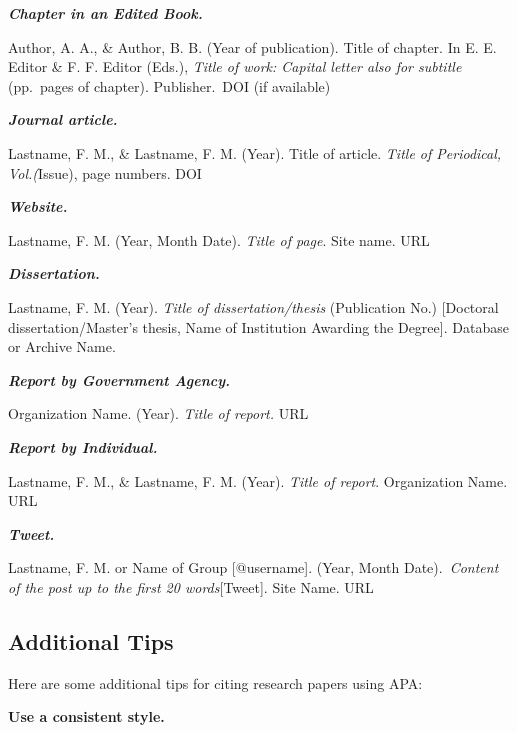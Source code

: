 \documentclass[
  b5paper]{book}
\begin{document}
\textbf{\emph{Chapter in an Edited Book.}}

Author, A. A., \& Author, B. B. (Year of publication). Title of chapter. In E. E. Editor \& F. F. Editor (Eds.), \emph{Title of work: Capital letter also for subtitle} (pp.~pages of chapter). Publisher.~DOI (if available)

\textbf{\emph{Journal article.}}

Lastname, F. M., \& Lastname, F. M. (Year). Title of article. \emph{Title of Periodical, Vol.(}Issue), page numbers. DOI

\textbf{\emph{Website.}}

Lastname, F. M. (Year, Month Date). \emph{Title of page}. Site name. URL

\textbf{\emph{Dissertation.}}

Lastname, F. M. (Year). \emph{Title of dissertation/thesis} (Publication No.) {[}Doctoral dissertation/Master's thesis, Name of Institution Awarding the Degree{]}. Database or Archive Name.

\textbf{\emph{Report by Government Agency.}}

Organization Name. (Year). \emph{Title of report.} URL

\textbf{\emph{Report by Individual.}}

Lastname, F. M., \& Lastname, F. M. (Year). \emph{Title of report}. Organization Name. URL

\textbf{\emph{Tweet.}}

Lastname, F. M. or Name of Group {[}@username{]}. (Year, Month Date).~\emph{Content of the post up to the first 20 words}{[}Tweet{]}. Site Name. URL

\hypertarget{additional-tips-1}{%
\subsection*{Additional Tips}\label{additional-tips-1}}

Here are some additional tips for citing research papers using APA:

\textbf{Use a consistent style.}
\end{document}
